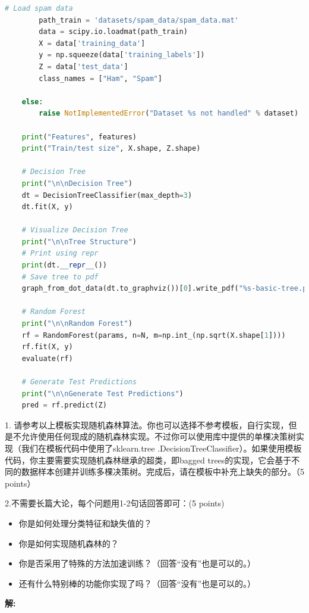 \documentclass[8pt]{article}
\begin{document}
\begin{lstlisting}[language=Python, caption=随机森林模型接口]
        # Load spam data
        path_train = 'datasets/spam_data/spam_data.mat'
        data = scipy.io.loadmat(path_train)
        X = data['training_data']
        y = np.squeeze(data['training_labels'])
        Z = data['test_data']
        class_names = ["Ham", "Spam"]

    else:
        raise NotImplementedError("Dataset %s not handled" % dataset)

    print("Features", features)
    print("Train/test size", X.shape, Z.shape)

    # Decision Tree
    print("\n\nDecision Tree")
    dt = DecisionTreeClassifier(max_depth=3)
    dt.fit(X, y)

    # Visualize Decision Tree
    print("\n\nTree Structure")
    # Print using repr
    print(dt.__repr__())
    # Save tree to pdf
    graph_from_dot_data(dt.to_graphviz())[0].write_pdf("%s-basic-tree.pdf" % dataset)

    # Random Forest
    print("\n\nRandom Forest")
    rf = RandomForest(params, n=N, m=np.int_(np.sqrt(X.shape[1])))
    rf.fit(X, y)
    evaluate(rf)

    # Generate Test Predictions
    print("\n\nGenerate Test Predictions")
    pred = rf.predict(Z)

\end{lstlisting}

1. 请参考以上模板实现随机森林算法。你也可以选择不参考模板，自行实现，但是不允许使用任何现成的随机森林实现。不过你可以使用库中提供的单棵决策树实现（我们在模板代码中使用了sklearn.tree .DecisionTreeClassifier）。如果使用模板代码，你主要需要实现随机森林继承的超类，即bagged trees的实现，它会基于不同的数据样本创建并训练多棵决策树。完成后，请在模板中补充上缺失的部分。（5 points）

2.不需要长篇大论，每个问题用1-2句话回答即可：(5 points)
\begin{itemize}
\item 你是如何处理分类特征和缺失值的？
\item 你是如何实现随机森林的？
\item 你是否采用了特殊的方法加速训练？（回答“没有”也是可以的。）
\item 还有什么特别棒的功能你实现了吗？（回答“没有”也是可以的。）
\end{itemize}

\textbf{\large 解:}

\vspace{3em}
\end{document}
